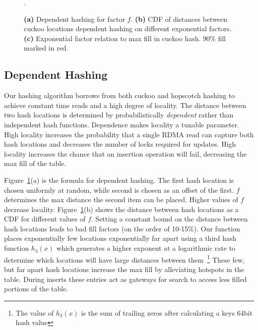 \begin{figure}[t]
\begin{subfigure}{0.3\linewidth}
    \end{subfigure}.
    \vspace{-1em}
    \caption{
    \textbf{(a)} Dependent hashing for factor $f$.
    \textbf{(b)} CDF of distances between cuckoo locations dependent hashing on different exponential factors.
    \textbf{(c)} Exponential factor relation to max fill in cuckoo hash. 90\% fill marked in red.
    }
    \label{fig:locality-hashing}

\end{figure}




\subsection{Dependent Hashing}

Our hashing algorithm borrows from both cuckoo and hopscotch
hashing to achieve constant time reads and a high degree of
locality. The distance between two hash locations is
determined by probabilistically \textit{dependent} rather
than independent hash functions. Dependence makes locality a
tunable parameter. High locality increases the probability
that a single RDMA read can capture both hash locations and
decreases the number of locks required for updates. High
locality increases the chance that an insertion operation
will fail, decreasing the max fill of the table.

Figure~\ref{fig:locality-hashing}(a) is the formula for dependent
hashing. The first hash location is chosen uniformly at
random, while second is chosen as an offset of the first.
$f$ determines the max distance the second item can be
placed. Higher values of $f$ decrease locality.
Figure~\ref{fig:locality-hashing}(b) shows the distance between hash
locations as a CDF for different values of $f$. Setting a
constant bound on the distance between hash locations leads
to bad fill factors (on the order of 10-15\%). Our function
places exponentially few locations exponentially far apart
using a third hash function $h_3(x)$ which generates a
higher exponent at a logarithmic rate to determine which
locations will have large distances between
them~\footnote{The value of $h_3(x)$ is the sum of trailing
zeros after calculating a keys 64bit hash value} These few,
but far apart hash locations increase the max fill by
alleviating hotspots in the table. During inserts these
entries act as gateways for search to access less filled
portions of the table. 

